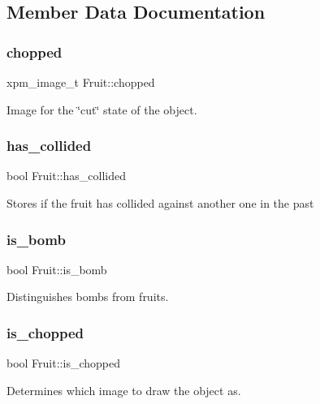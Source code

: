 \subsection{Member Data Documentation}
\mbox{\label{structFruit_aa5354964e7b2d36d50ec862395131f28}} 
\subsubsection{\texorpdfstring{chopped}{chopped}}
{\footnotesize\ttfamily xpm\+\_\+image\+\_\+t Fruit\+::chopped}

Image for the \char`\"{}cut\char`\"{} state of the object. \mbox{\label{structFruit_a8fb85e06a75c3455fd53cc7fa9243ce7}} 
\subsubsection{\texorpdfstring{has\+\_\+collided}{has\_collided}}
{\footnotesize\ttfamily bool Fruit\+::has\+\_\+collided}

Stores if the fruit has collided against another one in the past \mbox{\label{structFruit_a4efa820e5e590d6f16062993452b7210}} 
\subsubsection{\texorpdfstring{is\+\_\+bomb}{is\_bomb}}
{\footnotesize\ttfamily bool Fruit\+::is\+\_\+bomb}

Distinguishes bombs from fruits. \mbox{\label{structFruit_a1847b2662bc2eb7a8f427b69a4346fa7}} 
\subsubsection{\texorpdfstring{is\+\_\+chopped}{is\_chopped}}
{\footnotesize\ttfamily bool Fruit\+::is\+\_\+chopped}

Determines which image to draw the object as. \mbox{\label{structFruit_a17e2ee1928c9adf7aa06b9f82811b5a3}} 
